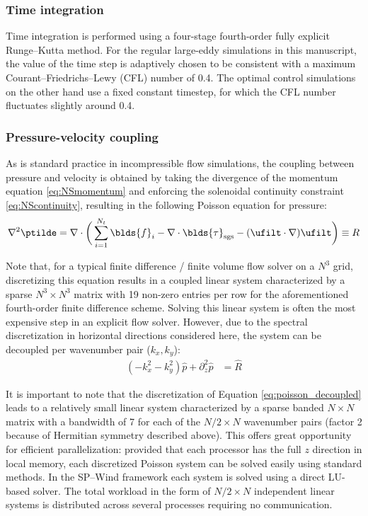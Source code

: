 \subsubsection{Time integration}
Time integration is performed using a four-stage fourth-order fully explicit Runge--Kutta method. For the regular large-eddy simulations in this manuscript, the value of the time step is adaptively chosen to be consistent with a maximum Courant--Friedrichs--Lewy (CFL) number of 0.4. The optimal control simulations on the other hand use a fixed constant timestep, for which the CFL number fluctuates slightly around 0.4. 

\subsubsection{Pressure-velocity coupling}
As is standard practice in incompressible flow simulations, the coupling between pressure and velocity is obtained by taking the divergence of the momentum equation \eqref{eq:NSmomentum} and enforcing the solenoidal continuity constraint \eqref{eq:NScontinuity}, resulting in the following Poisson equation for pressure: 
\begin{equation}
	\nabla^2 \ptilde = \nabla \cdot \bigg( \sum_{i=1}^{N_t} \blds{f}_i - \nabla \cdot \blds{\tau}_{\text{sgs}} - (\ufilt \cdot \nabla) \ufilt \bigg) \equiv R
\end{equation}

Note that, for a typical finite difference / finite volume flow solver on a $N^3$ grid, discretizing this equation results in a coupled linear system characterized by a sparse $N^3 \times N^3$ matrix with 19 non-zero entries per row for the aforementioned fourth-order finite difference scheme. Solving this linear system is often the most expensive step in an explicit flow solver. However, due to the spectral discretization in horizontal directions considered here, the system can be decoupled per wavenumber pair ($k_x, k_y$):
\begin{align}
	(-k_x^2 - k_y^2) \hat{p} + \partial^2_z \hat{p} &= \hat{R}\label{eq:poisson_decoupled}
\end{align}

It is important to note that the discretization of Equation \eqref{eq:poisson_decoupled} leads to a relatively small linear system characterized by a sparse banded $N \times N$ matrix with a bandwidth of 7 for each of the $N/2 \times N$ wavenumber pairs (factor 2 because of Hermitian symmetry described above). This offers great opportunity for efficient parallelization: provided that each processor has the full $z$ direction in local memory, each discretized Poisson system can be solved easily using standard methods. In the SP--Wind framework each system is solved using a direct LU-based solver. The total workload in the form of $N/2 \times N$ independent linear systems is distributed across several processes requiring no communication.

